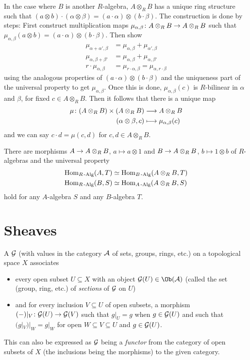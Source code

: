 \documentclass[a4paper,parskip=half,numbers=enddot, DIV=12]{scrreprt}
\begin{document}
In the case where $B$ is another $R$-algebra, $A\otimes_R B$ has a unique ring structure such that $(a\otimes b)\cdot(\alpha \otimes \beta) = (a \cdot \alpha)\otimes (b\cdot \beta)$. The construction is done by steps: First construct multiplication maps $\mu_{\alpha, \beta}\colon A\otimes_R B \morphism A\otimes_R B$ such that $\mu_{\alpha,\beta} (a\otimes b) = (a\cdot \alpha)\otimes (b\cdot \beta)$. Then show
\begin{align*}
    \mu_{\alpha+\alpha',\beta} &= \mu_{\alpha,\beta}+\mu_{\alpha',\beta}\\
    \mu_{\alpha,\beta+\beta'} &= \mu_{\alpha,\beta}+\mu_{\alpha,\beta'}\\
    r\cdot \mu_{\alpha,\beta} &= \mu_{r\cdot \alpha,\beta} =\mu_{\alpha,r\cdot \beta}
\end{align*}
using the analogous properties of $(a\cdot \alpha) \otimes (b\cdot \beta)$ and the uniqueness part of the universal property to get $\mu_{\alpha,\beta}$. Once this is done, $\mu_{\alpha,\beta}(c)$ is $R$-bilinear in $\alpha$ and $\beta$, for fixed $c\in A\otimes_R B$. Then it follows that there is a unique map
\begin{align*}
    \mu\colon (A\otimes_R B) \times (A\otimes_R B) &\morphism A\otimes_R B\\
    (\alpha \otimes \beta, c) &\longmapsto \mu_{\alpha,\beta}(c)
\end{align*}
and we can say $c\cdot d = \mu(c,d)$ for $c,d\in A\otimes_R B$.

There are morphisms $A\morphism A\otimes_R B$, $a\mapsto a\otimes 1$ and $B\morphism A\otimes_R B$, $b\mapsto 1\otimes b$ of $R$-algebras and the universal property
\begin{align*}
    \operatorname{Hom}_{R\operatorname{-Alg}} (A,T) &\simeq \operatorname{Hom}_{B\operatorname{-Alg}}(A\otimes_R B, T)\\
    \operatorname{Hom}_{R\operatorname{-Alg}} (B,S) &\simeq \operatorname{Hom}_{A\operatorname{-Alg}}(A\otimes_R B, S)
\end{align*}
hold for any $A$-algebra $S$ and any $B$-algebra $T$.

\section{Sheaves}

\begin{defi}[Presheaf]
    A  $\mathcal{G}$ (with values in the category $\mathcal{A}$ of sets, groups, rings, etc.) on a topological space $X$ associates
    \begin{itemize}
    	\item every open subset $U\subseteq X$ with an object $\Gg(U)\in\Ob(\Aa)$ (called the set (group, ring, etc.) of \emph{sections} of $\mathcal{G}$ on  $U$)
    	\item and for every inclusion $V\subseteq U$ of open subsets, a morphism $(-)|_V\colon \Gg(U)\morphism \Gg(V)$ such that $g|_U = g$ when $g\in \mathcal{G}(U)$ and such that $(g|_V)|_W = g|_W$ for open $W\subseteq V\subseteq U$ and $g\in \mathcal{G}(U)$. 
    \end{itemize}
    This can also be expressed as $\mathcal{G}$ being a \emph{functor} from the category of open subsets of $X$ (the inclusions being the morphisms) to the given category.
\end{defi}
\end{document}
